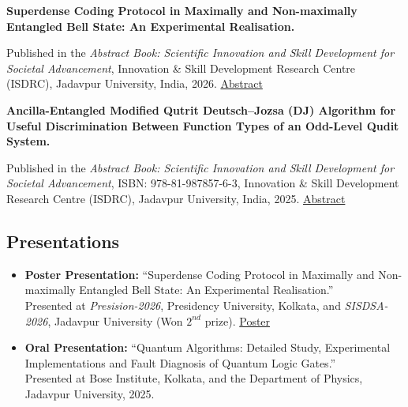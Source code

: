 \documentclass[11pt,a4paper]{article}
\begin{document}
\begin{enumerate}[leftmargin=1.6em,label={[\arabic*]}]

    \item \textbf{Superdense Coding Protocol in Maximally and
    Non-maximally Entangled Bell State: An Experimental Realisation.}

    Published in the \textit{Abstract Book: Scientific Innovation and Skill Development for Societal Advancement}, Innovation \& Skill Development Research Centre (ISDRC), Jadavpur University,
    India, 2026. \href{https://drive.google.com/file/d/1ToPfW1x9e7QYZ5J9rGE3fAvibrJyEWTS/view}{Abstract}

    \item \textbf{Ancilla-Entangled Modified Qutrit Deutsch--Jozsa (DJ) Algorithm for Useful Discrimination Between Function Types of an Odd-Level Qudit System.}

    Published in the \textit{Abstract Book: Scientific Innovation
    and Skill Development for Societal Advancement}, ISBN:
    978-81-987857-6-3, Innovation \& Skill Development Research Centre (ISDRC), Jadavpur University, India, 2025. \href{https://drive.google.com/file/d/1ACMXFrVa7RHp0wzm-JgYlG7j_JYHoosi/view}{Abstract}

\end{enumerate}



\subsection*{Presentations}

\begin{itemize}

    \item \textbf{Poster Presentation:} ``Superdense Coding Protocol in Maximally and Non-maximally Entangled Bell State: An Experimental Realisation.''\\
Presented at \textit{Presision-2026}, Presidency University, Kolkata, and \textit{SISDSA-2026}, Jadavpur University (Won $2^{nd}$ prize). \href{https://drive.google.com/file/d/1eJ5AMMzWMnt3Mb0F7u2ODuxFsIbAxwHX/view}{Poster}

    \item \textbf{Oral Presentation:} ``Quantum Algorithms:
    Detailed Study, Experimental Implementations and Fault Diagnosis of Quantum Logic Gates.''\\
    Presented at Bose Institute, Kolkata, and the Department of Physics, Jadavpur University, 2025.

\end{itemize}
\end{document}
